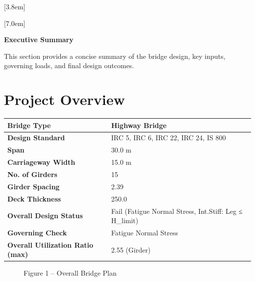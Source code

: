 \documentclass[12pt,a4paper]{report}
\numberwithin{table}{chapter}
\numberwithin{figure}{chapter}
\begin{document}
[3.8em]
  {\normalfont}
  {\contentslabel{2.3em}}
  {\hspace*{-2.3em}}
  {\hfill\contentspage}

[7.0em]
  {\normalfont}
  {\contentslabel{3.2em}}
  {\hspace*{-3.2em}}
  {\hfill\contentspage}

\newpage
\renewcommand{\contentsname}{\centering\Large\bfseries Table of Contents}
\tableofcontents


\newpage
{\centering\Large\bfseries Executive Summary\par}
\vspace{0.8em}

This section provides a concise summary of the bridge design, key inputs, governing loads, and final design outcomes.

\section*{Project Overview}
\label{sec:project-overview}


\begin{tabular}{|L{5.5cm}|L{8.5cm}|}
\hline
\textbf{Bridge Type} & Highway Bridge \\
\hline
\textbf{Design Standard} & IRC 5, IRC 6, IRC 22, IRC 24, IS 800 \\
\hline
\textbf{Span} & 30.0 m \\
\hline
\textbf{Carriageway Width} & 15.0 m \\
\hline
\textbf{No. of Girders} & 15 \\
\hline
\textbf{Girder Spacing} & 2.39 \\
\hline
\textbf{Deck Thickness} & 250.0 \\
\hline
\textbf{Overall Design Status} & Fail (Fatigue Normal Stress, Int.Stiff:\allowbreak{} Leg ≤ H\_\allowbreak{}limit) \\
\hline
\textbf{Governing Check} & Fatigue Normal Stress \\
\hline
\textbf{Overall Utilization Ratio (max)} & 2.55 (Girder) \\
\hline
\end{tabular}


\begin{figure}[H]
\centering
{}
\caption*{Figure 1 -- Overall Bridge Plan}
\end{figure}
\end{document}
